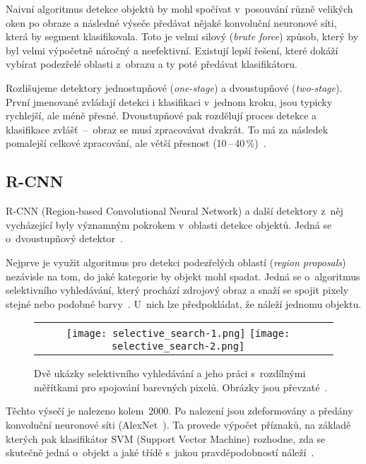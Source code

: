 Naivní algoritmus detekce objektů by mohl spočívat v~posouvání různě velikých oken po obraze a následné výseče předávat nějaké konvoluční neuronové síti, která by segment klasifikovala. Toto je velmi silový (\textit{brute force}) způsob, který by byl velmi výpočetně náročný a neefektivní. Existují lepší řešení, které dokáží vybírat podezřelé oblasti z~obrazu a ty poté předávat klasifikátoru.

Rozlišujeme detektory jednostupňové (\textit{one-stage}) a dvoustupňové (\textit{two-stage}). První jmenované zvládají detekci i klasifikaci v~jednom kroku, jsou typicky rychlejší, ale méně přesné. Dvoustupňové pak rozdělují proces detekce a klasifikace zvlášť~--~obraz se musí zpracovávat dvakrát. To má za následek pomalejší celkové zpracování, ale větší přesnost (10\,--\,40\,\%)~\cite{paperFocalLoss}.


\subsection*{R-CNN}

R-CNN (Region-based Convolutional Neural Network) a další detektory z~něj vycházející byly významným pokrokem v~oblasti detekce objektů. Jedná se o~dvoustupňový detektor~\cite{mediumRcnn}.

Nejprve je využit algoritmus pro detekci podezřelých oblastí (\textit{region proposals}) nezávisle na tom, do jaké kategorie by objekt mohl spadat. Jedná se o~algoritmus selektivního vyhledávání, který prochází zdrojový obraz a snaží se spojit pixely stejné nebo podobné barvy~\cite{paperRcnn}. U~nich lze předpokládat, že náleží jednomu objektu.

\begin{figure}[H]
    \begin{tabular}{cc}
        \texttt{[image: selective\_search-1.png]}\hfill
        \texttt{[image: selective\_search-2.png]}
    \end{tabular}
    \caption[Ukázky selektivního vyhledávání detektoru R-CNN]{Dvě ukázky selektivního vyhledávání a jeho práci s~rozdílnými měřítkami pro spojování barevných pixelů. Obrázky jsou převzaté~\cite{mediumRcnn}.}
    \label{fig_selective_search}
\end{figure}

Těchto výsečí je nalezeno kolem~2000. Po nalezení jsou zdeformovány a předány konvoluční neuronové síti (AlexNet~\cite{paperKriz}). Ta provede výpočet příznaků, na základě kterých pak klasifikátor SVM (Support Vector Machine) rozhodne, zda se skutečně jedná o~objekt a jaké třídě s~jakou pravděpodobností náleží~\cite{paperRcnn}.

